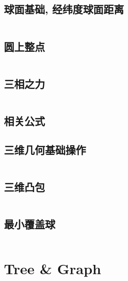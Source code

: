 \documentclass[titlepage, a4paper, 11pt]{article}
\begin{document}
\begin{spacing}{1.15}
				\subsection{球面基础, 经纬度球面距离}
				\begin{small}
					
				\end{small}
					\inputminted{cpp}{src/Geometry/经纬度求球面最短距离.cpp}
				\subsection{圆上整点}
					\inputminted{cpp}{src/Geometry/圆上整点.cpp}
				\subsection{三相之力}
				\inputminted{cpp}{src/Geometry/三角形.cpp}
				\subsection{相关公式}
					
				\subsection{三维几何基础操作}
					\inputminted{cpp}{src/Geometry/三维几何.cpp}
				\subsection{三维凸包}
					\inputminted{cpp}{src/Geometry/三维凸包.cpp}
				\subsection{最小覆盖球}
					\inputminted{cpp}{src/Geometry/最小覆盖球.cpp}
					\newpage
					
			\section{Tree \& Graph}
				

\end{spacing}
\end{document}
